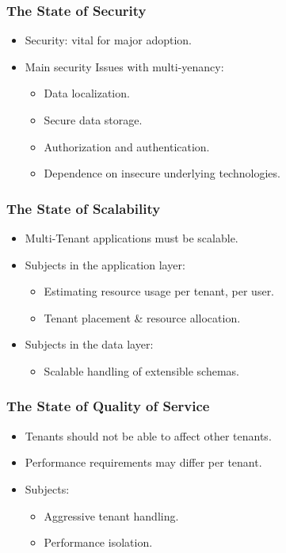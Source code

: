 \documentclass{beamer}
\begin{document}
\begin{frame}\frametitle{\textbf{\LARGE{\textrm{The State of Security}}}}
	\begin{itemize}
		\item Security: vital for major adoption.
		\item Main security Issues with multi-yenancy:
		\begin{itemize}
			\item Data localization.
			\item Secure data storage.
			\item Authorization and authentication.
			\item Dependence on insecure underlying technologies.
		\end{itemize}
	\end{itemize}
\end{frame}

\begin{frame}\frametitle{\textbf{\LARGE{\textrm{The State of Scalability}}}}
	\begin{itemize}
		\item Multi-Tenant applications must be scalable.
		\item Subjects in the application layer:
			\begin{itemize}
				\item Estimating resource usage per tenant, per user.
				\item Tenant placement \& resource allocation.
			\end{itemize}
		\item Subjects in the data layer:
			\begin{itemize}
				\item Scalable handling of extensible schemas.
			\end{itemize}
	\end{itemize}
\end{frame}

\begin{frame}\frametitle{\textbf{\LARGE{\textrm{The State of Quality of Service}}}}
	\begin{itemize}
		\item Tenants should not be able to affect other tenants.
		\item Performance requirements may differ per tenant.
		\item Subjects: %
			\begin{itemize}
				\item Aggressive tenant handling.
				\item Performance isolation.
			\end{itemize}
	\end{itemize}
\end{frame}
\end{document}

